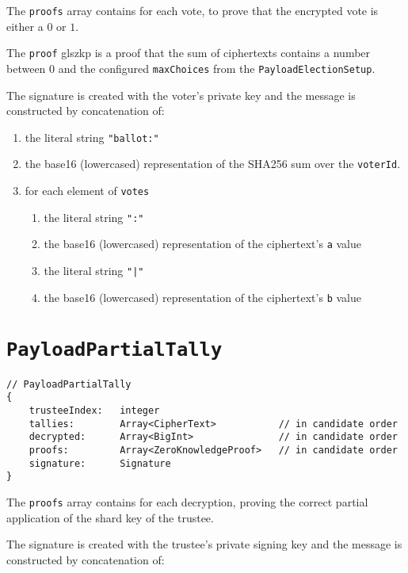 The \texttt{proofs} array contains  for each vote, to prove that the encrypted vote is either a $0$ or $1$.

The \texttt{proof} gls{zkp} is a proof that the sum of ciphertexts contains a number between $0$ and the configured \texttt{maxChoices} from the \texttt{PayloadElectionSetup}.

The signature is created with the voter's private key and the message is constructed by concatenation of:

\begin{enumerate}
    \item the literal string \lstinline[style=ES6]{"ballot:"}
    \item the base16 (lowercased) representation of the SHA256 sum over the \texttt{voterId}.
    \item for each element of \texttt{votes}
          \begin{enumerate}
              \item the literal string \lstinline[style=ES6]{":"}
              \item the base16 (lowercased) representation of the ciphertext's \texttt{a} value
              \item the literal string \lstinline[style=ES6]{"|"}
              \item the base16 (lowercased) representation of the ciphertext's \texttt{b} value
          \end{enumerate}
\end{enumerate}

\section*{\texttt{PayloadPartialTally}}
\label{dt:payload:tally}
\begin{lstlisting}[style=ES6]
// PayloadPartialTally
{
    trusteeIndex:   integer
    tallies:        Array<CipherText>           // in candidate order
    decrypted:      Array<BigInt>               // in candidate order
    proofs:         Array<ZeroKnowledgeProof>   // in candidate order
    signature:      Signature
}
\end{lstlisting}

The \texttt{proofs} array contains  for each decryption, proving the correct partial application of the shard key of the trustee.

The signature is created with the trustee's private signing key and the message is constructed by concatenation of:

